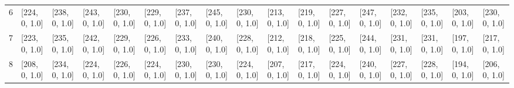\begin{tabular}{lllllllllllllllll}
6    &    [224, 0, 1.0] &    [238, 0, 1.0] &    [243, 0, 1.0] &   [230, 0, 1.0] &  [229, 0, 1.0] &   [237, 0, 1.0] &    [245, 0, 1.0] &  [230, 0, 1.0] &   [213, 0, 1.0] &    [219, 0, 1.0] &    [227, 0, 1.0] &  [247, 0, 1.0] &    [232, 0, 1.0] &   [235, 0, 1.0] &  [203, 0, 1.0] &    [230, 0, 1.0] \\
7    &    [223, 0, 1.0] &    [235, 0, 1.0] &    [242, 0, 1.0] &   [229, 0, 1.0] &  [226, 0, 1.0] &   [233, 0, 1.0] &    [240, 0, 1.0] &  [228, 0, 1.0] &   [212, 0, 1.0] &    [218, 0, 1.0] &    [225, 0, 1.0] &  [244, 0, 1.0] &    [231, 0, 1.0] &   [231, 0, 1.0] &  [197, 0, 1.0] &    [217, 0, 1.0] \\
8    &    [208, 0, 1.0] &    [234, 0, 1.0] &    [224, 0, 1.0] &   [226, 0, 1.0] &  [224, 0, 1.0] &   [230, 0, 1.0] &    [230, 0, 1.0] &  [224, 0, 1.0] &   [207, 0, 1.0] &    [217, 0, 1.0] &    [224, 0, 1.0] &  [240, 0, 1.0] &    [227, 0, 1.0] &   [228, 0, 1.0] &  [194, 0, 1.0] &    [206, 0, 1.0] \\
\bottomrule
\end{tabular}

